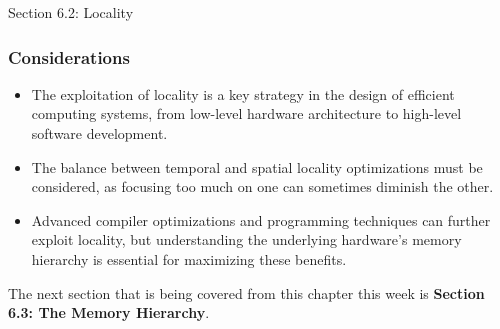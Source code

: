 \begin{notes}{Section 6.2: Locality}
    \subsubsection*{Considerations}
    
    \begin{itemize}
        \item The exploitation of locality is a key strategy in the design of efficient computing systems, from low-level hardware architecture to high-level software development.
        \item The balance between temporal and spatial locality optimizations must be considered, as focusing too much on one can sometimes diminish the other.
        \item Advanced compiler optimizations and programming techniques can further exploit locality, but understanding the underlying hardware's memory hierarchy is essential for maximizing these benefits.
    \end{itemize}
\end{notes}

The next section that is being covered from this chapter this week is \textbf{Section 6.3: The Memory Hierarchy}.

